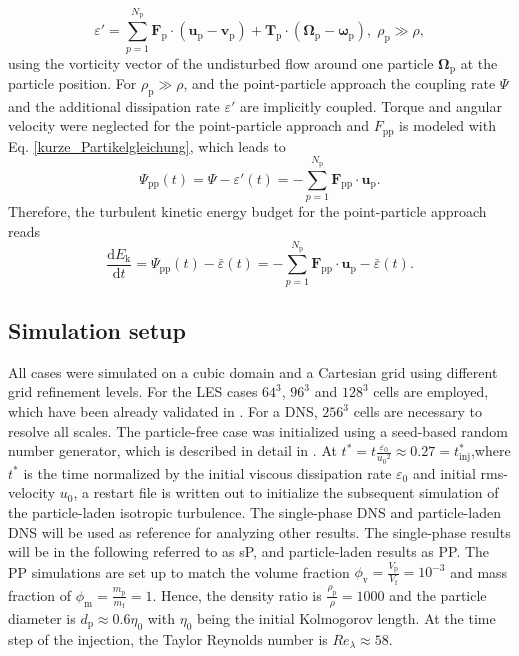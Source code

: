 \documentclass[11pt,a4paper,openany,oneside,parskip=half*]{article}
\renewcommand*\vec[1]{\boldsymbol{#1}}
\begin{document}
\begin{equation}
	\varepsilon' = \sum_{p=1}^{N_\mathrm{p}} \vec{F}_\mathrm{p} \cdot (\vec{u}_\mathrm{p}-\vec{v}_\mathrm{p})+ \vec{T}_\mathrm{p} \cdot (\vec{\Omega}_\mathrm{p} - \vec{\omega}_\mathrm{p}), \; \rho_\mathrm{p} \gg \rho,
\end{equation}
using the vorticity vector of the undisturbed flow around one particle $\vec{\Omega}_\mathrm{p}$ at the particle position.
\newline
For $\rho_\mathrm{p} \gg \rho$, and the point-particle approach the coupling rate $\Psi$ and the additional dissipation rate $\varepsilon'$ are implicitly coupled. Torque and angular velocity were neglected for the point-particle approach and $F_\mathrm{pp}$ is modeled with Eq. \ref{kurze_Partikelgleichung}, which leads to
\begin{equation}
\Psi_\mathrm{pp} (t) = \Psi - \varepsilon'(t) = - \sum_{p=1}^{N_\mathrm{p}} \vec{F}_\mathrm{pp} \cdot \vec{u}_\mathrm{p}.
\end{equation}
Therefore, the turbulent kinetic energy budget for the point-particle approach reads
\begin{equation}
\frac{\mathrm{d} E_\mathrm{k}}{\mathrm{d} t} = \Psi_\mathrm{pp} (t) - \bar{\varepsilon} (t) = - \sum_{p=1}^{N_\mathrm{p}} \vec{F}_\mathrm{pp} \cdot \vec{u}_\mathrm{p} - \bar{\varepsilon} (t).
\end{equation}
\newline
\subsection{Simulation setup}
All cases were simulated on a cubic domain and a Cartesian grid using different grid refinement levels. For the LES cases $64^3$, $96^3$ and $128^3$ cells are employed, which have been already validated in \cite{ValidationOfParticleLadenLargeEddySimulationUsingHPCSystems}. For a DNS, $256^3$ cells are necessary to resolve all scales.
\newline
The particle-free case was initialized using a seed-based random number generator, which is described in detail in \cite{orszag1969numerical}. At $t^*=t\frac{\varepsilon_\mathrm{0}}{{u_\mathrm{0}}^2} \approx 0.27=t_\mathrm{inj}^*$,where $t^*$ is the time normalized by the initial viscous dissipation rate $\varepsilon_\mathrm{0}$ and initial rms-velocity $u_\mathrm{0}$, a restart file is written out to initialize the subsequent simulation of the particle-laden isotropic turbulence.
\newline
The single-phase DNS and particle-laden DNS will be used as reference for analyzing other results. The single-phase results will be in the following referred to as sP, and particle-laden results as PP. The PP simulations are set up to match the volume fraction $\phi_\mathrm{v}=\frac{V_\mathrm{p}}{V_\mathrm{f}}= 10^{-3}$ and mass fraction of $\phi_\mathrm{m}=\frac{m_\mathrm{p}}{m_\mathrm{f}}=1$. Hence, the density ratio is $\frac{\rho_\mathrm{p}}{\rho} = 1000$ and the particle diameter is $d_\mathrm{p} \approx 0.6 \eta_\mathrm{0}$ with $\eta_\mathrm{0}$ being the initial Kolmogorov length. At the time step of the injection, the Taylor Reynolds number is $Re_\lambda \approx 58$. 
\newline
\end{document}
